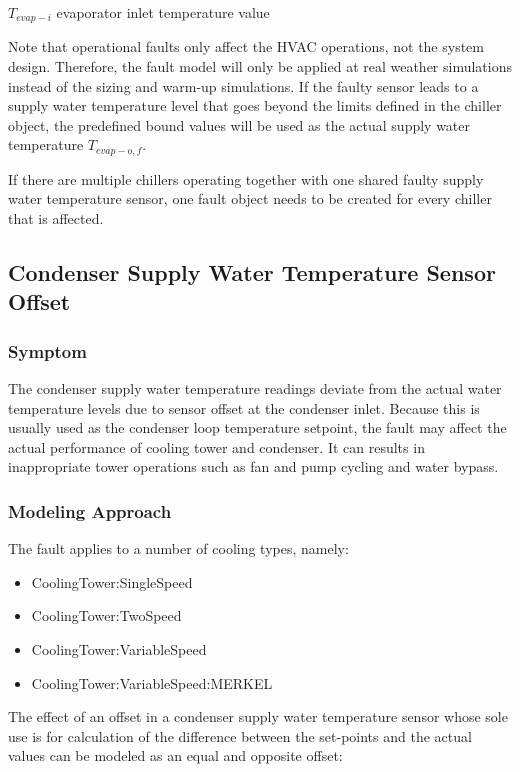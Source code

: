 \(T_{evap-i}\) evaporator inlet temperature value 

Note that operational faults only affect the HVAC operations, not the system design. Therefore, the fault model will only be applied at real weather simulations instead of the sizing and warm-up simulations. If the faulty sensor leads to a supply water temperature level that goes beyond the limits defined in the chiller object, the predefined bound values will be used as the actual supply water temperature \(T_{evap-o,f}\).

If there are multiple chillers operating together with one shared faulty supply water temperature sensor, one fault object needs to be created for every chiller that is affected.

\subsection{Condenser Supply Water Temperature Sensor Offset}\label{condenser-supply-water-temperature-sensor-offset}

\subsubsection{Symptom}

The condenser supply water temperature readings deviate from the actual water temperature levels due to sensor offset at the condenser inlet. Because this is usually used as the condenser loop temperature setpoint, the fault may affect the actual performance of cooling tower and condenser. It can results in inappropriate tower operations such as fan and pump cycling and water bypass. 

\subsubsection{Modeling Approach}

The fault applies to a number of cooling types, namely:

\begin{itemize}
\tightlist
\item
  CoolingTower:SingleSpeed
\item
  CoolingTower:TwoSpeed
\item
  CoolingTower:VariableSpeed
\item
  CoolingTower:VariableSpeed:MERKEL
\end{itemize}

The effect of an offset in a condenser supply water temperature sensor whose sole use is for calculation of the difference between the set-points and the actual values can be modeled as an equal and opposite offset: 

